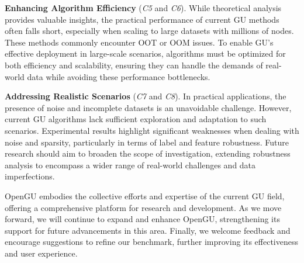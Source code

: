 \textbf{Enhancing Algorithm Efficiency} (\textit{C5} and \textit{C6}). While theoretical analysis provides valuable insights, the practical performance of current GU methods often falls short, especially when scaling to large datasets with millions of nodes. These methods commonly encounter OOT or OOM issues. To enable GU's effective deployment in large-scale scenarios, algorithms must be optimized for both efficiency and scalability, ensuring they can handle the demands of real-world data while avoiding these performance bottlenecks.

\textbf{Addressing Realistic Scenarios} (\textit{C7} and \textit{C8}). In practical applications, the presence of noise and incomplete datasets is an unavoidable challenge. However, current GU algorithms lack sufficient exploration and adaptation to such scenarios. Experimental results highlight significant weaknesses when dealing with noise and sparsity, particularly in terms of label and feature robustness. Future research should aim to broaden the scope of investigation, extending robustness analysis to encompass a wider range of real-world challenges and data imperfections.

OpenGU embodies the collective efforts and expertise of the current GU field, offering a comprehensive platform for research and development. As we move forward, we will continue to expand and enhance OpenGU, strengthening its support for future advancements in this area. Finally, we welcome feedback and encourage suggestions to refine our benchmark, further improving its effectiveness and user experience.